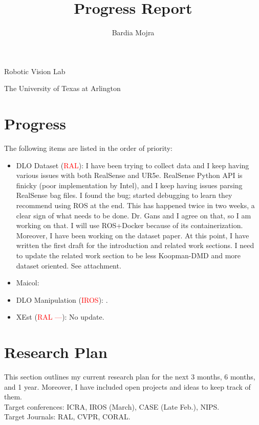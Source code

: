 \documentclass[11pt]{article}
\title{Progress Report}
\author{Bardia Mojra}
\begin{document}
\maketitle
\thispagestyle{empty}

\bigskip
\bigskip
\begin{center}
 Robotic Vision Lab
\end{center}

\begin{center}
The University of Texas at Arlington
\end{center}

\newpage



\section{Progress}
The following items are listed in the order of priority:
\begin{itemize}
  \item DLO Dataset (\textcolor{red}{RAL}): I have been trying to collect data
  and I keep having various issues with both RealSense and UR5e. RealSense
  Python API is finicky (poor implementation by Intel), and I keep having issues
  parsing RealSense bag files. I found the bug; started debugging to learn
  they recommend using ROS at the end. This has happened twice in two weeks,
  a clear sign of what needs to be done. Dr. Gans and I agree on that, so I am
  working on that. I will use ROS+Docker because of its containerization.
  Moreover, I have been working on the dataset paper. At this point, I have
  written the first draft for the introduction and related work sections. I need 
  to update the related work section to be less Koopman-DMD and 
  more dataset oriented. See attachment. \\
  \item Maicol: \\
  \item DLO Manipulation (\textcolor{red}{IROS}): \cite{abraham2017model}.\\
  \item XEst (\textcolor{red}{RAL ---}): No update.\\
  \end{itemize}

\section{Research Plan}
This section outlines my current research plan for the next 3 months, 6 months,
and 1 year. Moreover, I have included open projects and ideas to keep track of
them.\\
Target conferences: ICRA, IROS (March), CASE (Late Feb.), NIPS.\\
Target Journals: RAL, CVPR, CORAL.\\
\end{document}
